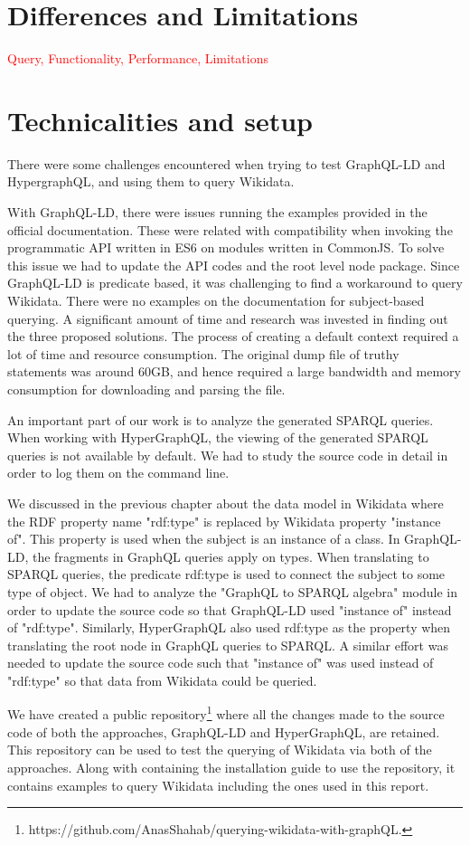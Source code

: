 \section{Differences and Limitations}

\textcolor{red}{Query, Functionality, Performance, Limitations}

\section{Technicalities and setup}
There were some challenges encountered when trying to test GraphQL-LD and HypergraphQL, and using them to query Wikidata. 

With GraphQL-LD, there were issues running the examples provided in the official documentation. These were related with compatibility when invoking the programmatic API written in ES6 on modules written in CommonJS. To solve this issue we had to update the API codes and the root level node package. Since GraphQL-LD is predicate based, it was challenging to find a workaround to query Wikidata. There were no examples on the documentation for subject-based querying. A significant amount of time and research was invested in finding out the three proposed solutions. The process of creating a default context required a lot of time and resource consumption. The original dump file of truthy statements was around 60GB, and hence required a large bandwidth and memory consumption for downloading and parsing the file. 

An important part of our work is to analyze the generated SPARQL queries. When working with HyperGraphQL, the viewing of the generated SPARQL queries is not available by default. We had to study the source code in detail in order to log them on the command line. 

We discussed in the previous chapter about the data model in Wikidata where the RDF property name "rdf:type" is replaced by Wikidata property "instance of". This property is used when the subject is an instance of a class. In GraphQL-LD, the fragments in GraphQL queries apply on types. When translating to SPARQL queries, the predicate rdf:type is used to connect the subject to some type of object. We had to analyze the "GraphQL to SPARQL algebra" module in order to update the source code so that GraphQL-LD used "instance of" instead of "rdf:type". Similarly, HyperGraphQL also used rdf:type as the property when translating the root node in GraphQL queries to SPARQL. A similar effort was needed to update the source code such that "instance of" was used instead of "rdf:type" so that data from Wikidata could be queried.

We have created a public repository\footnote{https://github.com/AnasShahab/querying-wikidata-with-graphQL.} where all the changes made to the source code of both the approaches, GraphQL-LD and HyperGraphQL, are retained. This repository can be used to test the querying of Wikidata via both of the approaches. Along with containing the installation guide to use the repository, it contains examples to query Wikidata including the ones used in this report.